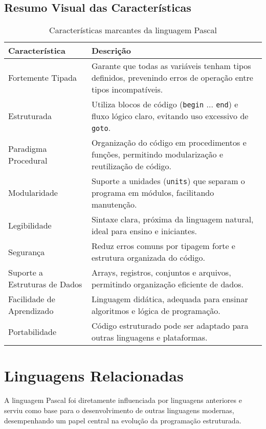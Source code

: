 \documentclass[12pt,a4paper,oneside]{abntex2}
\begin{document}
\section{Resumo Visual das Características}
\begin{table}[H]
    \centering
    \caption{Características marcantes da linguagem Pascal}
    \label{tab:caracteristicas-resumo}
    \begin{tabular}{|l|p{10cm}|}
        \hline
        \textbf{Característica} & \textbf{Descrição} \\ \hline
        Fortemente Tipada & Garante que todas as variáveis tenham tipos definidos, prevenindo erros de operação entre tipos incompatíveis. \\ \hline
        Estruturada & Utiliza blocos de código (\texttt{begin} ... \texttt{end}) e fluxo lógico claro, evitando uso excessivo de \texttt{goto}. \\ \hline
        Paradigma Procedural & Organização do código em procedimentos e funções, permitindo modularização e reutilização de código. \\ \hline
        Modularidade & Suporte a unidades (\texttt{units}) que separam o programa em módulos, facilitando manutenção. \\ \hline
        Legibilidade & Sintaxe clara, próxima da linguagem natural, ideal para ensino e iniciantes. \\ \hline
        Segurança & Reduz erros comuns por tipagem forte e estrutura organizada do código. \\ \hline
        Suporte a Estruturas de Dados & Arrays, registros, conjuntos e arquivos, permitindo organização eficiente de dados. \\ \hline
        Facilidade de Aprendizado & Linguagem didática, adequada para ensinar algoritmos e lógica de programação. \\ \hline
        Portabilidade & Código estruturado pode ser adaptado para outras linguagens e plataformas. \\ \hline
    \end{tabular}
\end{table}

\chapter{Linguagens Relacionadas}
A linguagem Pascal foi diretamente influenciada por linguagens anteriores e serviu como base para o desenvolvimento de outras linguagens modernas, desempenhando um papel central na evolução da programação estruturada.
\end{document}

